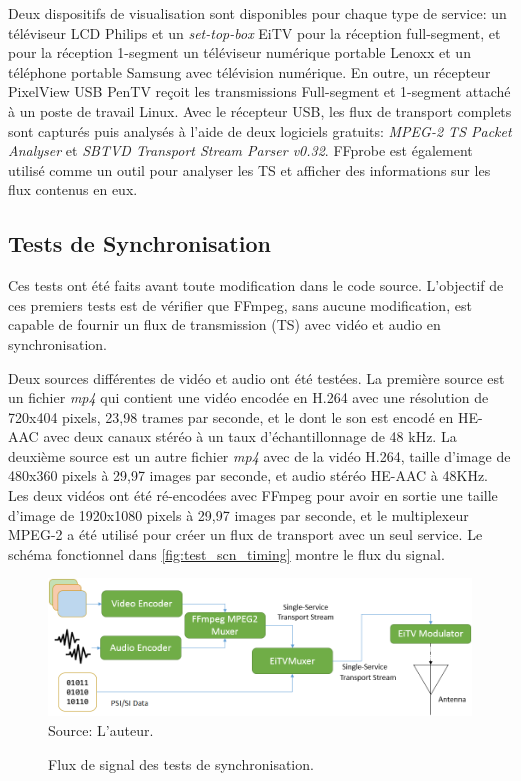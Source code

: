 \documentclass[12pt,a4paper]{article}
\begin{document}
Deux dispositifs de visualisation sont disponibles pour chaque type de service: un téléviseur LCD Philips et un \textit{set-top-box} EiTV pour la réception full-segment, et pour la réception 1-segment un téléviseur numérique portable Lenoxx et un téléphone portable Samsung avec télévision numérique. En outre, un récepteur PixelView USB PenTV reçoit les transmissions Full-segment et 1-segment attaché à un poste de travail Linux. Avec le récepteur USB, les flux de transport complets sont capturés puis analysés à l'aide de deux logiciels gratuits: \textit{MPEG-2 TS Packet Analyser} et \textit{SBTVD Transport Stream Parser v0.32}. FFprobe est également utilisé comme un outil pour analyser les TS et afficher des informations sur les flux contenus en eux.

\subsection{Tests de Synchronisation}

Ces tests ont été faits avant toute modification dans le code source. L'objectif de ces premiers tests est de vérifier que FFmpeg, sans aucune modification, est capable de fournir un flux de transmission (TS) avec vidéo et audio en synchronisation.

Deux sources différentes de vidéo et audio ont été testées. La première source est un fichier \textit{mp4} qui contient une vidéo encodée en H.264 avec une résolution de 720x404 pixels, 23,98 trames par seconde, et le dont le son est encodé en HE-AAC avec deux canaux stéréo à un taux d'échantillonnage de 48 kHz. La deuxième source est un autre fichier \textit {mp4} avec de la vidéo H.264, taille d'image de 480x360 pixels à 29,97 images par seconde, et audio stéréo HE-AAC à 48KHz. Les deux vidéos ont été ré-encodées avec FFmpeg pour avoir en sortie une taille d'image de 1920x1080 pixels à 29,97 images par seconde, et le multiplexeur MPEG-2 a été utilisé pour créer un flux de transport avec un seul service. Le schéma fonctionnel dans \autoref{fig:test_scn_timing} montre le flux du signal.

\begin{figure}[!hb]
\centering
\caption{Flux de signal des tests de synchronisation.}
\includegraphics[width=0.9\linewidth]{pictures/test_scn_timing.png}
\\Source: L'auteur.
\label{fig:test_scn_timing}
\end{figure}
\end{document}
